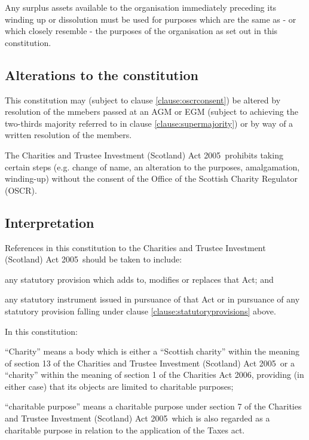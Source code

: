 \documentclass{article}
\newcommand{\charityact}{Charities and Trustee Investment (Scotland) Act 2005}
\begin{document}
\clause Any surplus assets available to the organisation immediately
preceding its winding up or dissolution must be used for purposes
which are the same as - or which closely resemble - the purposes of
the organisation as set out in this constitution.

\subsection{Alterations to the constitution}

\clause This constitution may (subject to clause
\ref{clause:oscrconsent}) be altered by resolution of the mmebers
passed at an AGM or EGM (subject to achieving the two-thirds majority
referred to in clause \ref{clause:supermajority}) or by way of a
written resolution of the members.

\clause\label{clause:oscrconsent}The \charityact\ prohibits taking
certain steps (e.g. change of name, an alteration to the purposes,
amalgamation, winding-up) without the consent of the Office of the
Scottish Charity Regulator (OSCR).

\subsection{Interpretation}

\clause References in this constitution to the \charityact\ should be
taken to include:

\subclause any statutory provision which adds to, modifies or replaces
that Act; and

\subclause any statutory instrument issued in pursuance of that Act or
in pursuance of any statutory provision falling under clause
\ref{clause:statutoryprovisions} above.

\clause In this constitution:

\subclause ``Charity'' means a body which is either a ``Scottish
charity'' within the meaning of section 13 of the \charityact\ or a
``charity'' within the meaning of section 1 of the Charities Act 2006,
providing (in either case) that its objects are limited to charitable
purposes; 

\subclause ``charitable purpose'' means a charitable purpose under
section 7 of the \charityact\ which is also regarded as a charitable
purpose in relation to the application of the Taxes act.
\end{document}
